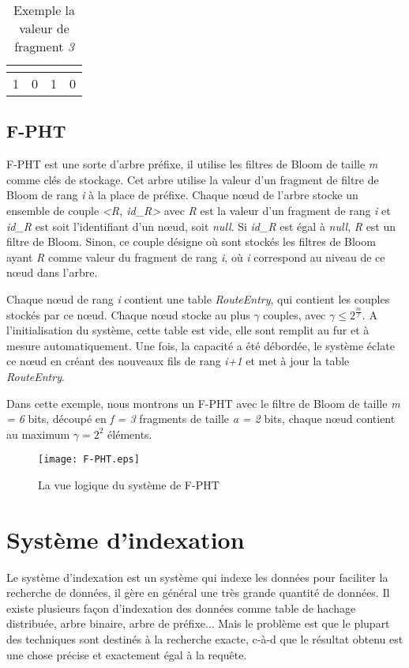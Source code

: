 \documentclass[a4paper,11pt]{report}
\begin{document}
	\begin{table}[!h]
		\centering
		\begin{tabular}{|l|c|c|r|}
		\multicolumn{1}{c}{}&\multicolumn{1}{c}{}&\multicolumn{1}{c}{}\\
		\hline
			1 & 0 & 1 & 0 \\
		\hline
		\end{tabular}
		\caption{Exemple la valeur de fragment \textit{3}}
		\label{fragement/exemple2}
	\end{table}
	
\section{F-PHT}
	F-PHT est une sorte d'arbre préfixe, il utilise  les filtres de Bloom  de taille \textit{m} comme clés de stockage. Cet arbre utilise la valeur d'un fragment de filtre de Bloom de rang \textit{i} à la place de préfixe. Chaque nœud de l'arbre stocke un ensemble de couple \textit{<R, id\_R>} avec \textit{R} est la valeur d'un fragment de rang \textit{i} et \textit{id\_R} est soit l'identifiant d'un nœud, soit \textit{null}. Si \textit{id\_R} est égal à \textit{null}, \textit{R} est un filtre de Bloom. Sinon, ce couple désigne où sont stockés les filtres de Bloom ayant \textit{R} comme valeur du fragment de rang \textit{i}, où \textit{i} correspond au niveau de ce nœud dans l'arbre.

	Chaque nœud de rang \textit{i} contient une table \textit{RouteEntry}, qui contient les couples stockés par ce nœud. Chaque nœud stocke au plus $\gamma$ couples, avec $\gamma \leq 2^{\frac{m}{f}}$. A l'initialisation du système, cette table est vide, elle sont remplit au fur et à mesure automatiquement. Une fois, la capacité a été débordée, le système éclate ce nœud en créant des nouveaux fils de rang \textit{i+1} et met à jour la table \textit{RouteEntry}.
	
	Dans cette exemple, nous montrons un F-PHT avec le filtre de Bloom de taille \textit{m = 6} bits, découpé en \textit{f = 3} fragments de taille \textit{a = 2} bits, chaque nœud contient au maximum $\gamma = 2^{2}$ éléments.
	
	\begin{figure}[!htbp]
	\centering
	\texttt{[image: F-PHT.eps]}
	\caption{La vue logique du système de F-PHT}
	\label{F-PHT}
	\end{figure}	
	
\chapter{Système d'indexation}
	Le système d'indexation est un système qui indexe les données pour faciliter la recherche de données, il gère en général une très grande quantité de données. Il existe plusieurs façon d'indexation des données comme table de hachage distribuée, arbre binaire, arbre de préfixe... Mais le problème est que le plupart des techniques sont destinés à la recherche exacte, c-à-d que le résultat obtenu est une chose précise et exactement égal à la requête.
	
\end{document}
